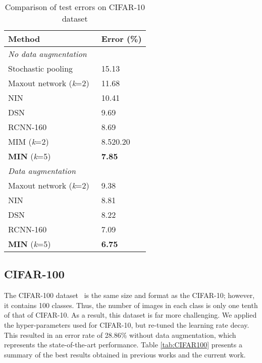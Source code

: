 \documentclass[10pt,twocolumn,letterpaper]{article}
\begin{document}
\begin{table}
\begin{center}
\caption{Comparison of test errors on CIFAR-10 dataset}
\begin{tabular}{|p{1.6in}|p{0.6in}|} \hline 
Method & Error (\%) \\ \hline 
\multicolumn{2}{|p{1.6in}|}{\textit{No data augmentation}} \\ \hline 
Stochastic pooling~\cite{zeiler2013stochastic} & 15.13 \\ \hline 
Maxout network (\textit{k}=2)~\cite{goodfellow2013maxout} & 11.68 \\ \hline 
NIN~\cite{DBLP:journals/corr/LinCY13} & 10.41 \\ \hline 
DSN~\cite{lee2014deeply} & 9.69 \\ \hline 
RCNN-160~\cite{Liang_2015_CVPR} & 8.69 \\ \hline
MIM (\textit{k}=2)~\cite{liao2015importance} & 8.520.20 \\ \hline 
\textbf{MIN} (\textit{k}=5)\textbf{} & \textbf{7.85} \\ \hline
\multicolumn{2}{|p{1.6in}|}{\textit{Data augmentation}} \\ \hline 
Maxout network (\textit{k}=2)~\cite{goodfellow2013maxout} & 9.38 \\ \hline 
NIN~\cite{DBLP:journals/corr/LinCY13} & 8.81 \\ \hline 
DSN~\cite{lee2014deeply} & 8.22 \\ \hline 
RCNN-160~\cite{Liang_2015_CVPR} & 7.09 \\ \hline
\textbf{MIN} (\textit{k}=5)\textbf{} & \textbf{6.75} \\ \hline
\end{tabular}
\label{tab:CIFAR10}
\end{center}
\end{table}

\subsection{CIFAR-100}
The CIFAR-100 dataset~\cite{krizhevsky2009learning} is the same size and format as the CIFAR-10; however, it contains 100 classes. Thus, the number of images in each class is only one tenth of that of CIFAR-10. As a result, this dataset is far more challenging. We applied the hyper-parameters used for CIFAR-10, but re-tuned the learning rate decay. This resulted in an error rate of 28.86\% without data augmentation, which represents the state-of-the-art performance. Table \ref{tab:CIFAR100} presents a summary of the best results obtained in previous works and the current work.
\end{document}
